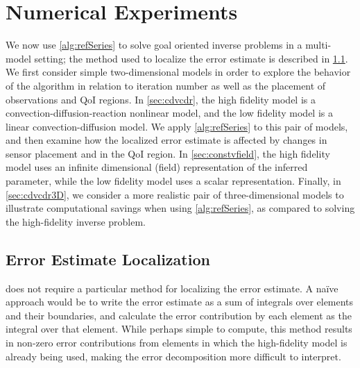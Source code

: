 \section{Numerical Experiments}\label{sect:numexp}
%
We now use \cref{alg:refSeries} to solve goal oriented inverse problems in a multi-model setting; the method used to localize the error estimate is described in \cref{sec:errLocal}. We first consider simple two-dimensional models in order to explore the behavior of the algorithm in relation to iteration number as well as the placement of observations and QoI regions. In \cref{sec:cdvcdr}, the high fidelity model is a convection-diffusion-reaction nonlinear model, and the low fidelity model is a linear convection-diffusion model. We apply \cref{alg:refSeries} to this pair of models, and then examine how the localized error estimate is affected by changes in sensor placement and in the QoI region. In \cref{sec:constvfield}, the high fidelity model uses an infinite dimensional (field) representation of the inferred parameter, while the low fidelity model uses a scalar representation.  Finally, in \cref{sec:cdvcdr3D}, we consider a more realistic pair of three-dimensional models to illustrate computational savings when using \cref{alg:refSeries}, as compared to solving the high-fidelity inverse problem.


\subsection{Error Estimate Localization} \label{sec:errLocal}
 does not require a particular method for localizing the error estimate. A na\"{i}ve approach would be to write the error estimate as a sum of integrals over elements and their boundaries, and calculate the error contribution by each element as the integral over that element. While perhaps simple to compute, this method results in non-zero error contributions from elements in which the high-fidelity model is already being used, making the error decomposition more difficult to interpret.

